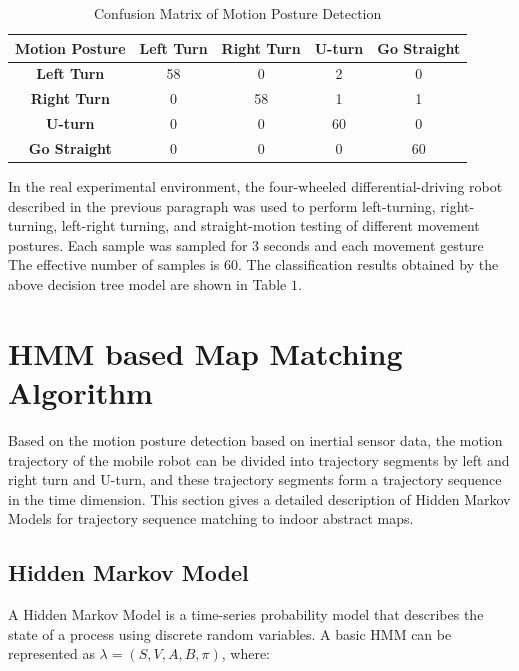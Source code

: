 \documentclass{llncs}
\begin{document}
\begin{table}
	\label{table_conf}
	\caption{Confusion Matrix of Motion Posture Detection}
	\begin{center}
		\begin{tabular}{| c || c | c | c | c |}
			\hline
			\bfseries Motion Posture & \bfseries Left Turn & \bfseries Right Turn & \bfseries U-turn & \bfseries Go Straight\\
			\hline\hline
			\bfseries Left Turn & 58 & 0 & 2 & 0 \\
			\hline
			\bfseries Right Turn & 0 & 58 & 1 & 1 \\
			\hline
			\bfseries U-turn & 0 & 0 & 60 & 0 \\
			\hline
			\bfseries Go Straight & 0 & 0 & 0 & 60 \\
			\hline
		\end{tabular}
	\end{center}
\end{table}

In the real experimental environment, the four-wheeled differential-driving robot described in the previous paragraph was used to perform left-turning, right-turning, left-right turning, and straight-motion testing of different movement postures. Each sample was sampled for 3 seconds and each movement gesture The effective number of samples is 60. The classification results obtained by the above decision tree model are shown in Table $1$.

\section{HMM based Map Matching Algorithm}

Based on the motion posture detection based on inertial sensor data, the motion trajectory of the mobile robot can be divided into trajectory segments by left and right turn and U-turn, and these trajectory segments form a trajectory sequence in the time dimension. This section gives a detailed description of Hidden Markov Models for trajectory sequence matching to indoor abstract maps.

\subsection{Hidden Markov Model}

A Hidden Markov Model is a time-series probability model that describes the state of a process using discrete random variables. A basic HMM can be represented as $\lambda  = (S,V,A,B,\pi)$, where:
\end{document}
